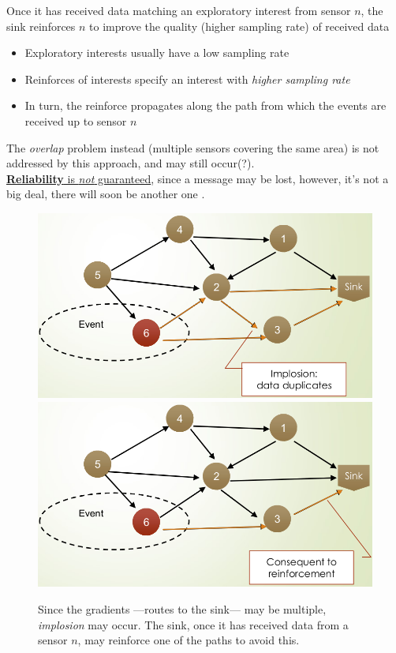 \begin{paracol}{2}
   \colfill
   Once it has received data matching an exploratory interest from sensor $n$, the sink reinforces $n$ to improve the quality (higher sampling rate) of received data
   \begin{itemize}
      \item Exploratory interests usually have a low sampling rate
      \item Reinforces of interests specify an interest with \textit{higher sampling rate}
      \item In turn, the reinforce propagates along the path from which the events are received up to sensor $n$
   \end{itemize}
   The \textit{overlap} problem instead (multiple sensors covering the same area) is not addressed by this approach, and may still occur(?).\\
   \ul{\textbf{Reliability} is \textit{not} guaranteed}, since a message may be lost, however, it's not a big deal, there will soon be another one \smiley.
   \colfill
   \switchcolumn
   \begin{figure}[htbp]
   \centering
   \includegraphics{images/wsn_ddiff_implosion.png}\\
   \includegraphics{images/wsn_ddiff_reinforcement.png}
   \caption{Since the gradients ---routes to the sink--- may be multiple, \textit{implosion} may occur. The sink, once it has received data from a sensor $n$, may reinforce one of the paths to avoid this.}
   \label{fig:wsn_ddiff_reinforcement}
   \end{figure}
\end{paracol}

